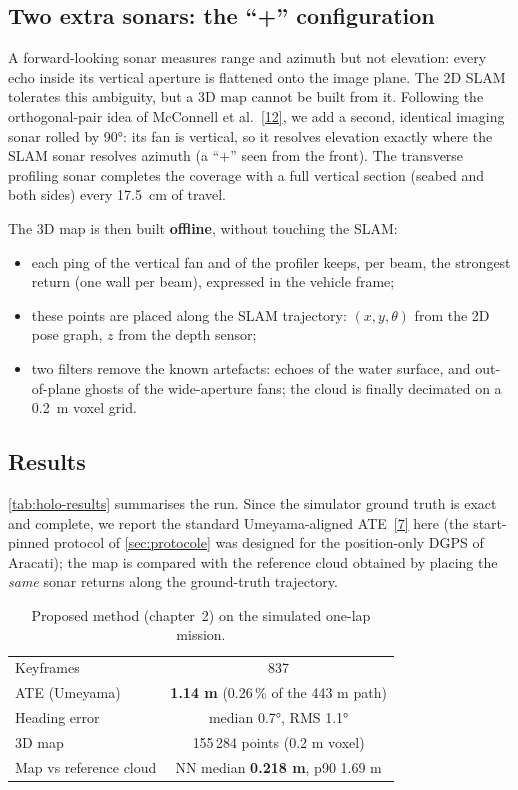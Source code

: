\subsection{Two extra sonars: the ``+'' configuration}
\label{sec:holo-plus}

A forward-looking sonar measures range and azimuth but not elevation: every
echo inside its vertical aperture is flattened onto the image plane. The 2D
SLAM tolerates this ambiguity, but a 3D map cannot be built from it. Following
the orthogonal-pair idea of McConnell et al.~\hyperref[bib:mcconnell]{[12]}, we add a second, identical
imaging sonar rolled by 90°: its fan is vertical, so it resolves elevation
exactly where the SLAM sonar resolves azimuth (a ``+'' seen from the front).
The transverse profiling sonar completes the coverage with a full vertical
section (seabed and both sides) every 17.5~cm of travel.

The 3D map is then built \textbf{offline}, without touching the SLAM:
\begin{itemize}
\item each ping of the vertical fan and of the profiler keeps, per beam, the
  strongest return (one wall per beam), expressed in the vehicle frame;
\item these points are placed along the SLAM trajectory: $(x, y, \theta)$ from
  the 2D pose graph, $z$ from the depth sensor;
\item two filters remove the known artefacts: echoes of the water surface, and
  out-of-plane ghosts of the wide-aperture fans; the cloud is finally
  decimated on a 0.2~m voxel grid.
\end{itemize}

\subsection{Results}
\label{sec:holo-results}

\autoref{tab:holo-results} summarises the run. Since the simulator ground
truth is exact and complete, we report the standard Umeyama-aligned
ATE~\hyperref[bib:umeyama]{[7]} here (the start-pinned protocol of \autoref{sec:protocole} was designed
for the position-only DGPS of Aracati); the map is compared with the reference
cloud obtained by placing the \emph{same} sonar returns along the ground-truth
trajectory.

\begin{table}[H]
\centering
\small
\begin{tabular}{lc}
\hline
Keyframes & 837 \\
ATE (Umeyama) & \textbf{1.14 m} (0.26\,\% of the 443 m path) \\
Heading error & median 0.7°, RMS 1.1° \\
3D map & 155\,284 points (0.2 m voxel) \\
Map vs reference cloud & NN median \textbf{0.218 m}, p90 1.69 m \\
\hline
\end{tabular}
\caption{Proposed method (chapter~2) on the simulated one-lap mission.}
\label{tab:holo-results}
\end{table}

